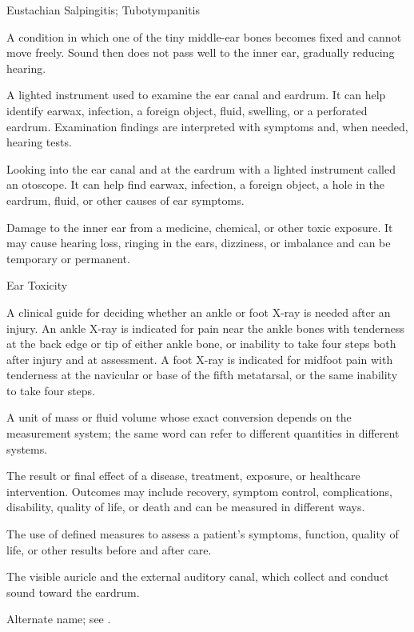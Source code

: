 \synonyms
Eustachian Salpingitis; Tubotympanitis

 A condition in which one of the tiny middle-ear bones becomes fixed and cannot move freely. Sound then does not pass well to the inner ear, gradually reducing hearing.

 A lighted instrument used to examine the ear canal and eardrum. It can help identify earwax, infection, a foreign object, fluid, swelling, or a perforated eardrum. Examination findings are interpreted with symptoms and, when needed, hearing tests.

 Looking into the ear canal and at the eardrum with a lighted instrument called an otoscope. It can help find earwax, infection, a foreign object, a hole in the eardrum, fluid, or other causes of ear symptoms.

 Damage to the inner ear from a medicine, chemical, or other toxic exposure. It may cause hearing loss, ringing in the ears, dizziness, or imbalance and can be temporary or permanent.

\synonyms
Ear Toxicity

 A clinical guide for deciding whether an ankle or foot X-ray is needed after an injury. An ankle X-ray is indicated for pain near the ankle bones with tenderness at the back edge or tip of either ankle bone, or inability to take four steps both after injury and at assessment. A foot X-ray is indicated for midfoot pain with tenderness at the navicular or base of the fifth metatarsal, or the same inability to take four steps.

 A unit of mass or fluid volume whose exact conversion depends on the measurement system; the same word can refer to different quantities in different systems.

 The result or final effect of a disease, treatment, exposure, or healthcare intervention. Outcomes may include recovery, symptom control, complications, disability, quality of life, or death and can be measured in different ways.

 The use of defined measures to assess a patient’s symptoms, function, quality of life, or other results before and after care.

 The visible auricle and the external auditory canal, which collect and conduct sound toward the eardrum.

 Alternate name; see .

